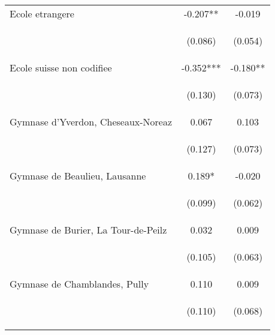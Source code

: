 \begin{tabular}{lcc}
Ecole etrangere & -0.207** & -0.019 \\
\vspace{4pt} & \begin{footnotesize}(0.086)\end{footnotesize} & \begin{footnotesize}(0.054)\end{footnotesize} \\
Ecole suisse non codifiee & -0.352*** & -0.180** \\
\vspace{4pt} & \begin{footnotesize}(0.130)\end{footnotesize} & \begin{footnotesize}(0.073)\end{footnotesize} \\
Gymnase d'Yverdon, Cheseaux-Noreaz & 0.067 & 0.103 \\
\vspace{4pt} & \begin{footnotesize}(0.127)\end{footnotesize} & \begin{footnotesize}(0.073)\end{footnotesize} \\
Gymnase de Beaulieu, Lausanne & 0.189* & -0.020 \\
\vspace{4pt} & \begin{footnotesize}(0.099)\end{footnotesize} & \begin{footnotesize}(0.062)\end{footnotesize} \\
Gymnase de Burier, La Tour-de-Peilz & 0.032 & 0.009 \\
\vspace{4pt} & \begin{footnotesize}(0.105)\end{footnotesize} & \begin{footnotesize}(0.063)\end{footnotesize} \\
Gymnase de Chamblandes, Pully & 0.110 & 0.009 \\
\vspace{4pt} & \begin{footnotesize}(0.110)\end{footnotesize} & \begin{footnotesize}(0.068)\end{footnotesize} \\

\end{tabular}

